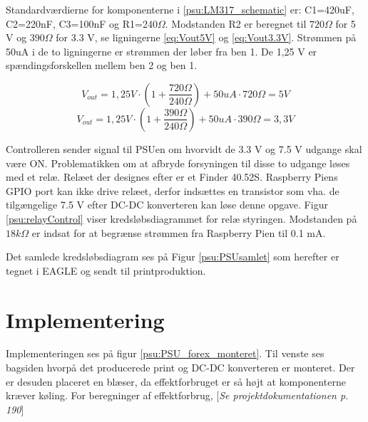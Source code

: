 
Standardværdierne for komponenterne i \ref{psu:LM317_schematic} er: C1=420uF, C2=220nF, C3=100nF og R1=240$\Omega$. Modstanden R2 er beregnet til $720\Omega$ for 5 V og $390\Omega$ for 3.3 V, se ligningerne \ref{eq:Vout5V} og \ref{eq:Vout3.3V}. Strømmen på 50uA i de to ligningerne er strømmen der løber fra ben 1. De 1,25 V er spændingsforskellen mellem ben 2 og ben 1. 

\begin{equation} 
{ V }_{ out }=1,25V\cdot \left( 1+\frac { 720\Omega  }{ 240\Omega  }  \right) +50uA\cdot 720\Omega =5V
\label{eq:Vout5V}
\end{equation}
\begin{equation} 
{ V }_{ out }=1,25V\cdot \left( 1+\frac { 390\Omega  }{ 240\Omega  }  \right) +50uA\cdot 390\Omega =3,3V
\label{eq:Vout3.3V}
\end{equation}

Controlleren sender signal til PSUen om hvorvidt de 3.3 V og 7.5 V udgange skal være ON. Problematikken om at afbryde forsyningen til disse to udgange løses med et relæ. Relæet der designes efter er et Finder 40.52S. Raspberry Piens GPIO port kan ikke drive relæet, derfor indsættes en transistor som vha. de tilgængelige 7.5 V efter DC-DC konverteren kan løse denne opgave. Figur \ref{psu:relayControl} viser kredsløbsdiagrammet for relæ styringen. Modstanden på $18k\Omega$ er indsat for at begrænse strømmen fra Raspberry Pien til 0.1 mA. 


Det samlede kredsløbsdiagram ses på Figur \ref{psu:PSUsamlet} som herefter er tegnet i EAGLE og sendt til printproduktion. 

\section{Implementering}

Implementeringen ses på figur \ref{psu:PSU_forex_monteret}. Til venste ses bagsiden hvorpå det producerede print og DC-DC konverteren er monteret. Der er desuden placeret en blæser, da effektforbruget er så højt at komponenterne kræver køling. For beregninger af effektforbrug, [\textit{Se projektdokumentationen p. 190}]


